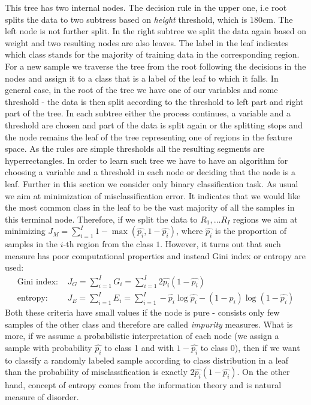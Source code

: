 \documentclass[shortabstract, english, mgr]{iithesis}
\begin{document}
This tree has two internal nodes. The decision rule in the upper one, i.e root splits the data to two subtress based on \textit{height} threshold, which is $180$cm. The left node is not further split. In the right subtree we split the data again based on weight and two resulting nodes are also leaves. The label in the leaf indicates which class stands for the majority of training data in the corresponding region. For a new sample we traverse the tree from the root following the decisions in the nodes and assign it to a class that is a label of the leaf to which it falls. In general case, in the root of the tree we have one of our variables and some threshold - the data is then split according to the threshold to left part and right part of the tree. In each subtree either the process continues, a variable and a threshold are chosen and part of the data is split again or the splitting stops and the node remains the leaf of the tree representing one of regions in the feature space. As the rules are simple thresholds all the resulting segments are hyperrectangles. In order to learn such tree we have to have an algorithm for choosing a variable and a threshold in each node or deciding that the node is a leaf. Further in this section we consider only binary classification task. As usual we aim at minimization of misclassification error. It indicates that we would like the most common class in the leaf to be the vast majority of all the samples in this terminal node. Therefore, if we split the data to $R_1, \ldots R_I$ regions we aim at minimizing $J_M = \sum_{i=1}^I 1 - \max(\hat{p_i}, 1-\hat{p_i})$, where $\hat{p_i}$ is the proportion of samples in the $i$-th region from the class $1$. However, it turns out that such measure has poor computational properties and instead Gini index or entropy are used:
\begin{align*}
        \text{Gini index:  } &J_G = \sum_{i=1}^I G_i = \sum_{i=1}^I 2\hat{p_i}(1-\hat{p_i}) \\
        \text{entropy:  } &J_E = \sum_{i=1}^I E_i= \sum_{i=1}^I -\hat{p_i}\log \hat{p_i} - (1-\hat{p_i}) \log (1-\hat{p_i})
\end{align*}
Both these criteria have small values if the node is pure - consists only few samples of the other class and therefore are called \textit{impurity} measures. What is more, if we assume a probabilistic interpretation of each node (we assign a sample with probability $\hat{p_i}$ to class 1 and with $1-\hat{p_i}$ to class 0), then if we want to classify a randomly labeled sample according to class distribution in a leaf than the probability of misclassification is exactly $2\hat{p_i}(1-\hat{p_i})$. On the other hand, concept of entropy comes from the information theory and is natural measure of disorder.
\end{document}
